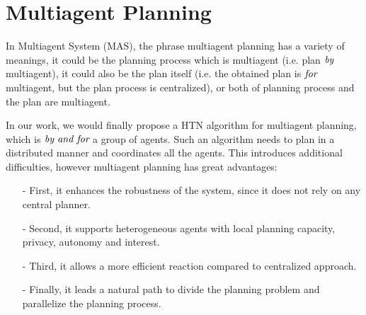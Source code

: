 \chapter{Multiagent Planning}
\label{chapter3}
In Multiagent System (MAS), the phrase multiagent planning has a variety of meanings, it could be the planning process which is multiagent (i.e. plan $\emph{by}$ multiagent), it could also be the plan itself (i.e. the obtained plan is $\emph{for}$ multiagent, but the plan process is centralized), or both of planning process and the plan are multiagent.

In our work, we would finally propose a HTN algorithm for multiagent planning, which is $\emph{by and for}$ a group of agents. Such an algorithm needs to plan in a distributed manner and coordinates all the agents. This introduces additional difficulties, however multiagent planning has great advantages: 
\begin{itemize}\itemsep0pt \parskip0pt 
\item[-]First, it enhances the robustness of the system, since it does not rely on any central planner. 
\item[-]Second, it supports heterogeneous agents with local planning capacity, privacy, autonomy and interest. 
\item[-]Third, it allows a more efficient reaction compared to centralized approach. 
\item[-]Finally, it leads a natural path to divide the planning problem and parallelize the planning process.
\end{itemize}

